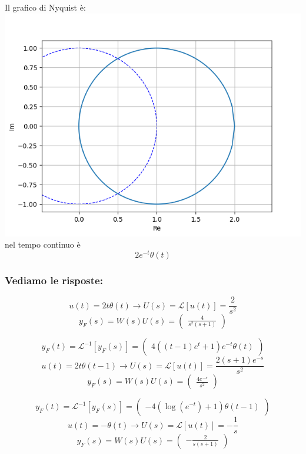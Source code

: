\documentclass{article}
\begin{document}
Il grafico di Nyquist è:
\includegraphics[scale = 0.5]{figures/nyquist_5514408.png}nel tempo continuo è \[ 2 e^{- t} \theta\left(t\right) \]
\subsubsection{Vediamo le risposte:}
\[ u(t) = 2 t \theta\left(t\right) \to U(s) = \mathcal{L}[u(t)] = \frac{2}{s^{2}} \]
\[ y_F(s) = W(s) U(s)  = \left(\begin{matrix}\frac{4}{s^{2} \left(s + 1\right)}\end{matrix}\right)\] 

\[ y_F(t) = \mathcal{L}^{-1}[y_F(s)] = \left(\begin{matrix}4 \left(\left(t - 1\right) e^{t} + 1\right) e^{- t} \theta\left(t\right)\end{matrix}\right) \]
\[ u(t) = 2 t \theta\left(t - 1\right) \to U(s) = \mathcal{L}[u(t)] = \frac{2 \left(s + 1\right) e^{- s}}{s^{2}} \]
\[ y_F(s) = W(s) U(s)  = \left(\begin{matrix}\frac{4 e^{- s}}{s^{2}}\end{matrix}\right)\] 

\[ y_F(t) = \mathcal{L}^{-1}[y_F(s)] = \left(\begin{matrix}- 4 \left(\log{\left(e^{- t} \right)} + 1\right) \theta\left(t - 1\right)\end{matrix}\right) \]
\[ u(t) = - \theta\left(t\right) \to U(s) = \mathcal{L}[u(t)] = - \frac{1}{s} \]
\[ y_F(s) = W(s) U(s)  = \left(\begin{matrix}- \frac{2}{s \left(s + 1\right)}\end{matrix}\right)\] 
\end{document}
